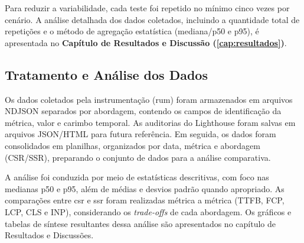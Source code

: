 Para reduzir a variabilidade, cada teste foi repetido no mínimo cinco vezes por cenário. A análise detalhada dos dados coletados, incluindo a quantidade total de repetições e o método de agregação estatística (mediana/p50 e p95), é apresentada no \textbf{Capítulo de Resultados e Discussão (\autoref{cap:resultados})}.

\subsection{Tratamento e Análise dos Dados}

Os dados coletados pela instrumentação (\acrshort{rum}) foram armazenados em arquivos NDJSON separados por abordagem, contendo os campos de identificação da métrica, valor e carimbo temporal. As auditorias do Lighthouse foram salvas em arquivos JSON/HTML para futura referência. Em seguida, os dados foram consolidados em planilhas, organizados por data, métrica e abordagem (CSR/SSR), preparando o conjunto de dados para a análise comparativa.

A análise foi conduzida por meio de estatísticas descritivas, com foco nas medianas p50 e p95, além de médias e desvios padrão quando apropriado. As comparações entre \acrshort{csr} e \acrshort{ssr} foram realizadas métrica a métrica (TTFB, FCP, LCP, CLS e INP), considerando os \textit{trade-offs} de cada abordagem. Os gráficos e tabelas de síntese resultantes dessa análise são apresentados no capítulo de Resultados e Discussões.

